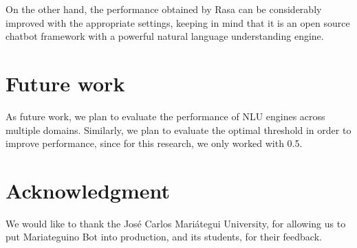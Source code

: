 \documentclass[conference, letterpaper]{IEEEtran}
\begin{document}
On the other hand, the performance obtained by Rasa can be considerably improved with the appropriate settings, keeping in mind that it is an open source chatbot framework with a powerful natural language understanding engine.

\section{Future work}

As future work, we plan to evaluate the performance of NLU engines across multiple domains. Similarly, we plan to evaluate the optimal threshold in order to improve performance, since for this research, we only worked with 0.5.


\section*{Acknowledgment}

We would like to thank the José Carlos Mariátegui University, for allowing us to put Mariateguino Bot into production, and its students, for their feedback.







\end{document}
